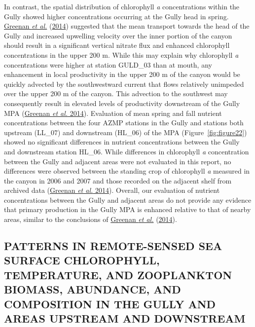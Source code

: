 \documentclass[12pt]{article}\usepackage[]{graphicx}\usepackage[]{color}
\begin{document}
In contrast, the spatial distribution of chlorophyll \emph{a} concentrations within the Gully showed higher concentrations occurring at the Gully head in spring. \protect\hyperlink{ref-greenan_2014}{Greenan \textit{et al.}} (\protect\hyperlink{ref-greenan_2014}{2014}) suggested that the mean transport towards the head of the Gully and increased upwelling velocity over the inner portion of the canyon should result in a significant vertical nitrate flux and enhanced chlorophyll concentrations in the upper 200 m. While this may explain why chlorophyll \emph{a} concentrations were higher at station GULD\_03 than at mouth, any enhancement in local productivity in the upper 200 m of the canyon would be quickly advected by the southwestward current that flows relatively unimpeded over the upper 200 m of the canyon. This advection to the southwest may consequently result in elevated levels of productivity downstream of the Gully MPA (\protect\hyperlink{ref-greenan_2014}{Greenan \textit{et al.} 2014}). Evaluation of mean spring and fall nutrient concentrations between the four AZMP stations in the Gully and stations both upstream (LL\_07) and downstream (HL\_06) of the MPA (Figure~\ref{fig:figure22}) showed no significant differences in nutrient concentrations between the Gully and downstream station HL\_06. While differences in chlorophyll \emph{a} concentration between the Gully and adjacent areas were not evaluated in this report, no differences were observed between the standing crop of chlorophyll \emph{a} measured in the canyon in 2006 and 2007 and those recorded on the adjacent shelf from archived data (\protect\hyperlink{ref-greenan_2014}{Greenan \textit{et al.} 2014}). Overall, our evaluation of nutrient concentrations between the Gully and adjacent areas do not provide any evidence that primary production in the Gully MPA is enhanced relative to that of nearby areas, similar to the conclusions of \protect\hyperlink{ref-greenan_2014}{Greenan \textit{et al.}} (\protect\hyperlink{ref-greenan_2014}{2014}).

\hypertarget{patterns-in-remote-sensed-sea-surface-chlorophyll-temperature-and-zooplankton-biomass-abundance-and-composition-in-the-gully-and-areas-upstream-and-downstream}{%
\subsection{\texorpdfstring{\textbf{PATTERNS IN REMOTE-SENSED SEA SURFACE CHLOROPHYLL, TEMPERATURE, AND ZOOPLANKTON BIOMASS, ABUNDANCE, AND COMPOSITION IN THE GULLY AND AREAS UPSTREAM AND DOWNSTREAM}}{PATTERNS IN REMOTE-SENSED SEA SURFACE CHLOROPHYLL, TEMPERATURE, AND ZOOPLANKTON BIOMASS, ABUNDANCE, AND COMPOSITION IN THE GULLY AND AREAS UPSTREAM AND DOWNSTREAM}}\label{patterns-in-remote-sensed-sea-surface-chlorophyll-temperature-and-zooplankton-biomass-abundance-and-composition-in-the-gully-and-areas-upstream-and-downstream}}
\end{document}
